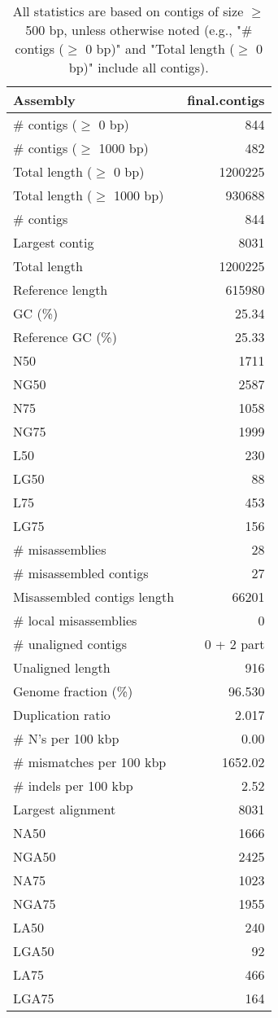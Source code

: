 \documentclass[12pt,a4paper]{article}
\begin{document}
\begin{table}[ht]
\begin{center}
\caption{All statistics are based on contigs of size $\geq$ 500 bp, unless otherwise noted (e.g., "\# contigs ($\geq$ 0 bp)" and "Total length ($\geq$ 0 bp)" include all contigs).}
\begin{tabular}{|l*{1}{|r}|}
\hline
Assembly & final.contigs \\ \hline
\# contigs ($\geq$ 0 bp) & 844 \\ \hline
\# contigs ($\geq$ 1000 bp) & 482 \\ \hline
Total length ($\geq$ 0 bp) & 1200225 \\ \hline
Total length ($\geq$ 1000 bp) & 930688 \\ \hline
\# contigs & 844 \\ \hline
Largest contig & 8031 \\ \hline
Total length & 1200225 \\ \hline
Reference length & 615980 \\ \hline
GC (\%) & 25.34 \\ \hline
Reference GC (\%) & 25.33 \\ \hline
N50 & 1711 \\ \hline
NG50 & 2587 \\ \hline
N75 & 1058 \\ \hline
NG75 & 1999 \\ \hline
L50 & 230 \\ \hline
LG50 & 88 \\ \hline
L75 & 453 \\ \hline
LG75 & 156 \\ \hline
\# misassemblies & 28 \\ \hline
\# misassembled contigs & 27 \\ \hline
Misassembled contigs length & 66201 \\ \hline
\# local misassemblies & 0 \\ \hline
\# unaligned contigs & 0 + 2 part \\ \hline
Unaligned length & 916 \\ \hline
Genome fraction (\%) & 96.530 \\ \hline
Duplication ratio & 2.017 \\ \hline
\# N's per 100 kbp & 0.00 \\ \hline
\# mismatches per 100 kbp & 1652.02 \\ \hline
\# indels per 100 kbp & 2.52 \\ \hline
Largest alignment & 8031 \\ \hline
NA50 & 1666 \\ \hline
NGA50 & 2425 \\ \hline
NA75 & 1023 \\ \hline
NGA75 & 1955 \\ \hline
LA50 & 240 \\ \hline
LGA50 & 92 \\ \hline
LA75 & 466 \\ \hline
LGA75 & 164 \\ \hline
\end{tabular}
\end{center}
\end{table}
\end{document}
